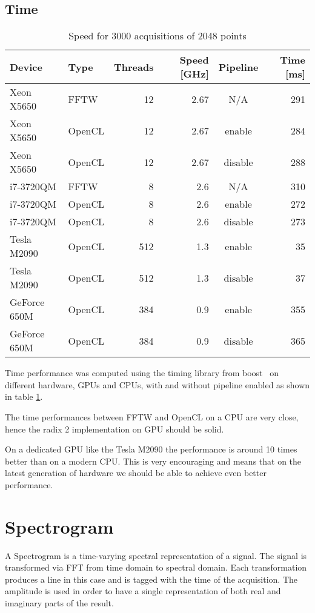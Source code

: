 \subsection{Time}

\begin{table}[H]
\caption{Speed for 3000 acquisitions of 2048 points}
\centering
\label{tab:speed}
\begin{tabular}{|l|lrrcr|}
\hline
Device & Type & Threads & Speed [GHz] & Pipeline & Time [ms] \\
\hline
\hline
Xeon X5650 & FFTW & 12 & 2.67 & N/A & 291 \\
Xeon X5650 & OpenCL & 12 & 2.67 & enable & 284 \\
Xeon X5650 & OpenCL & 12 & 2.67 & disable & 288 \\
\hline
i7-3720QM & FFTW & 8 & 2.6 & N/A & 310 \\
i7-3720QM & OpenCL & 8 & 2.6 & enable & 272 \\
i7-3720QM & OpenCL & 8 & 2.6 & disable & 273 \\
\hline
\hline
Tesla M2090 & OpenCL & 512 & 1.3 & enable & 35 \\
Tesla M2090 & OpenCL & 512 & 1.3 & disable & 37 \\
\hline
GeForce 650M & OpenCL & 384 & 0.9 & enable & 355 \\
GeForce 650M & OpenCL & 384 & 0.9 & disable & 365 \\
\hline
\end{tabular}
\end{table}

Time performance was computed using the timing library from boost~\cite{boost} on different hardware, \glspl{GPU} and \glspl{CPU}, with and without pipeline enabled as shown in table \ref{tab:speed}.

The time performances between \gls{FFTW} and \gls{OpenCL} on a \gls{CPU} are very close, hence the radix 2 implementation on \gls{GPU} should be solid.

On a dedicated \gls{GPU} like the Tesla M2090  the performance is around 10 times better than on a modern \gls{CPU}. This is very encouraging and means that on the latest generation of hardware we should be able to achieve even better performance.

\section{Spectrogram}
\label{sec:spectrogram}

A Spectrogram is a time-varying spectral representation of a
signal. The signal is transformed via \gls{FFT} from time domain to
spectral domain. Each transformation produces a line in this case and
is tagged with the time of the acquisition. The amplitude is used in
order to have a single representation of both real and imaginary parts
of the result.

